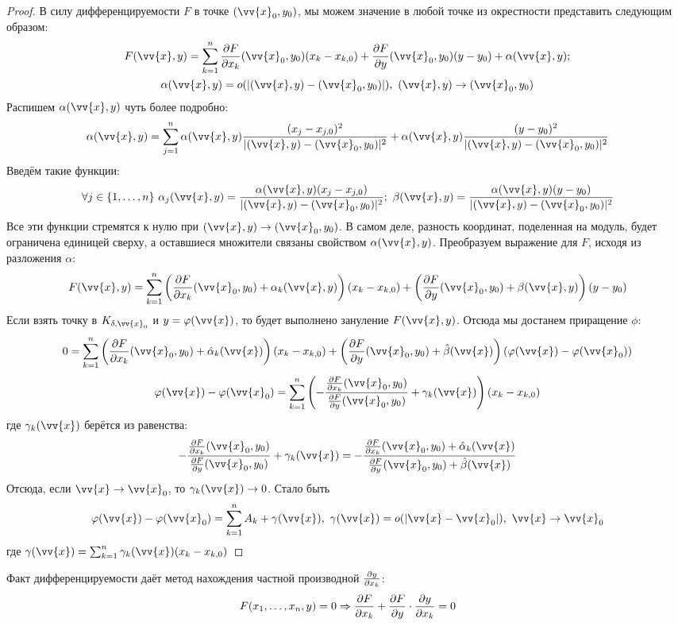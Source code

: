 \begin{proof}
	В силу дифференцируемости $F$ в точке $(\vv{x}_0, y_0)$, мы можем значение в любой точке из окрестности представить следующим образом:
	\begin{multline*}
		F(\vv{x}, y) = \sum_{k = 1}^n \pd{F}{x_k}(\vv{x}_0, y_0) (x_k - x_{k, 0}) + \pd{F}{y}(\vv{x}_0, y_0) (y - y_0) + \alpha(\vv{x}, y);
		\\
		\alpha(\vv{x}, y) = o(|(\vv{x}, y) - (\vv{x}_0, y_0)|),\ (\vv{x}, y) \to (\vv{x}_0, y_0)
	\end{multline*}
	Распишем $\alpha(\vv{x}, y)$ чуть более подробно:
	\[
		\alpha(\vv{x}, y) = \sum_{j = 1}^n \alpha(\vv{x}, y)\frac{(x_j - x_{j, 0})^2}{|(\vv{x}, y) - (\vv{x}_0, y_0)|^2} + \alpha(\vv{x}, y)\frac{(y - y_0)^2}{|(\vv{x}, y) - (\vv{x}_0, y_0)|^2}
	\]
	Введём такие функции:
	\[
		\forall j \in \range{n}\ \alpha_j(\vv{x}, y) = \frac{\alpha(\vv{x}, y)(x_j - x_{j, 0})}{|(\vv{x}, y) - (\vv{x}_0, y_0)|^2};\ \beta(\vv{x}, y) = \frac{\alpha(\vv{x}, y)(y - y_0)}{|(\vv{x}, y) - (\vv{x}_0, y_0)|^2}
	\]
	Все эти функции стремятся к нулю при $(\vv{x}, y) \to (\vv{x}_0, y_0)$. В самом деле, разность координат, поделенная на модуль, будет ограничена единицей сверху, а оставшиеся множители связаны свойством $\alpha(\vv{x}, y)$. Преобразуем выражение для $F$, исходя из разложения $\alpha$:
	\[
		F(\vv{x}, y) = \sum_{k = 1}^n \ps{\pd{F}{x_k} (\vv{x}_0, y_0) + \alpha_k(\vv{x}, y)}(x_k - x_{k, 0}) + \ps{\pd{F}{y}(\vv{x}_0, y_0) + \beta(\vv{x}, y)}(y - y_0)
	\]
	Если взять точку в $K_{\delta, \vv{x}_0}$ и $y = \phi(\vv{x})$, то будет выполнено зануление $F(\vv{x}, y)$. Отсюда мы достанем приращение $\phi$:
	\[
		0 = \sum_{k = 1}^n \ps{\pd{F}{x_k}(\vv{x}_0, y_0) + \hat{\alpha}_k(\vv{x})}(x_k - x_{k, 0}) + \ps{\pd{F}{y}(\vv{x}_0, y_0) + \hat{\beta}(\vv{x})}(\phi(\vv{x}) - \phi(\vv{x}_0))
	\]
	\[
		\phi(\vv{x}) - \phi(\vv{x}_0) = \sum_{k = 1}^n \ps{-\frac{\pd{F}{x_k}(\vv{x}_0, y_0)}{\pd{F}{y}(\vv{x}_0, y_0)} + \gamma_k(\vv{x})}(x_k - x_{k, 0})
	\]
	где $\gamma_k(\vv{x})$ берётся из равенства:
	\[
		-\frac{\pd{F}{x_k}(\vv{x}_0, y_0)}{\pd{F}{y}(\vv{x}_0, y_0)} + \gamma_k(\vv{x}) = -\frac{\pd{F}{x_k}(\vv{x}_0, y_0) + \hat{\alpha}_k(\vv{x})}{\pd{F}{y}(\vv{x}_0, y_0) + \hat{\beta}(\vv{x})}
	\]
	Отсюда, если $\vv{x} \to \vv{x}_0$, то $\gamma_k(\vv{x}) \to 0$. Стало быть
	\[
		\phi(\vv{x}) - \phi(\vv{x}_0) = \sum_{k = 1}^n A_k + \gamma(\vv{x}),\ \gamma(\vv{x}) = o(|\vv{x} - \vv{x}_0|),\ \vv{x} \to \vv{x}_0
	\]
	где $\gamma(\vv{x}) = \sum_{k = 1}^n \gamma_k(\vv{x})(x_k - x_{k, 0})$
\end{proof}

\begin{note}
	Факт дифференцируемости даёт метод нахождения частной производной $\frac{\partial y}{\partial x_k}$:
	\[
		F(x_1, \ldots, x_n, y) = 0 \Rightarrow \frac{\partial F}{\partial x_k} + \frac{\partial F}{\partial y} \cdot \frac{\partial y}{\partial x_k} = 0
	\]
\end{note}